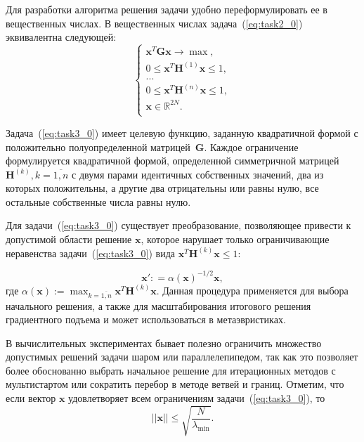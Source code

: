 Для разработки алгоритма решения задачи удобно переформулировать ее в вещественных числах. В вещественных числах задача~(\ref{eq:task2_0}) эквивалентна следующей:
        \begin{equation}
            \begin{cases}
               \textbf{x}^{T}\textbf{Gx} \rightarrow \max,\\
               0 \leq \textbf{x}^{T}\textbf{H}^{(1)}\textbf{x} \leq 1,\\
               ...\\
               0 \leq \textbf{x}^{T}\textbf{H}^{(n)}\textbf{x} \leq 1,\\
              \textbf{x} \in \mathbb{R}^{2N}.\\
             \end{cases}
             \label{eq:task3_0}
        \end{equation}

Задача~(\ref{eq:task3_0}) имеет целевую функцию, заданную квадратичной формой с положительно полуопределенной матрицей~$\textbf{G}$. Каждое ограничение формулируется квадратичной формой, определенной симметричной матрицей~$\textbf{H}^{(k)}, k=\overline{1,n}$ с двумя парами идентичных собственных значений, два из которых положительны, а другие два отрицательны или равны нулю, все остальные собственные числа равны нулю.

Для задачи~(\ref{eq:task3_0}) существует преобразование, позволяющее привести к допустимой области решение $\textbf{x}$, которое нарушает только ограничивающие неравенства задачи~(\ref{eq:task3_0}) вида $\textbf{x}^{T}\textbf{H}^{(k)}\textbf{x} \leq 1$:

\begin{equation}
    \textbf{x}': =\alpha(\textbf{x})^{-1/2} \textbf{x} ,
    \label{eq:scale_0}
\end{equation}
где $\alpha(\textbf{x}):=\max_{k=\overline{1,n}} \textbf{x}^T \textbf{H}^{(k)}\textbf{x}$. Данная процедура применяется для выбора начального решения, а также для масштабирования итогового решения градиентного подъема и может использоваться  в метаэвристиках.

В вычислительных экспериментах бывает полезно ограничить множество допустимых решений задачи шаром или параллелепипедом, так как это позволяет более обоснованно выбрать начальное решение для итерационных методов с мультистартом или сократить перебор в методе ветвей и границ. Отметим, что если вектор $\textbf{x}$ удовлетворяет всем ограничениям задачи~(\ref{eq:task3_0}), то
\begin{equation} \label{eqn:bound}
||\textbf{x}||\le \sqrt{\frac{N}{\lambda_{\min}}}.
\end{equation}

